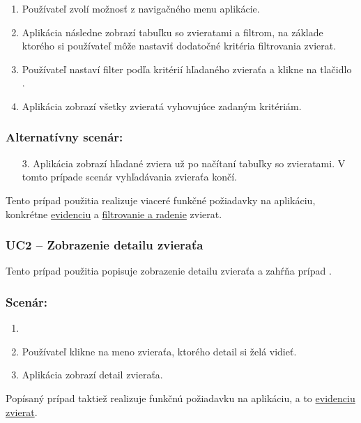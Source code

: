 \begin{enumerate}
	\item Používateľ zvolí možnosť  z navigačného menu aplikácie.
	\item Aplikácia následne zobrazí tabuľku so zvieratami a filtrom, na základe ktorého si používateľ môže nastaviť dodatočné kritéria filtrovania zvierat.
	\item Používateľ nastaví filter podľa kritérií hľadaného zvieraťa a klikne na tlačidlo .
	\item Aplikácia zobrazí všetky zvieratá vyhovujúce zadaným kritériám.
\end{enumerate}

\subsubsection*{Alternatívny scenár:}

\begin{enumerate}
    \item [3.] Aplikácia zobrazí hľadané zviera už po načítaní tabuľky so zvieratami. V tomto prípade scenár vyhľadávania zvieraťa končí.
\end{enumerate}

Tento prípad použitia realizuje viaceré funkčné požiadavky na aplikáciu, konkrétne \hyperref[evidencia-zvierat]{evidenciu} a \hyperref[filtrovanie-a-radenie]{filtrovanie a radenie} zvierat.

\subsubsection*{UC2 -- Zobrazenie detailu zvieraťa}\label{uc2}

Tento prípad použitia popisuje zobrazenie detailu zvieraťa a zahŕňa prípad .

\subsubsection*{Scenár:}

\begin{enumerate}
	\item {}
	\item Používateľ klikne na meno zvieraťa, ktorého detail si želá vidieť.
	\item Aplikácia zobrazí detail zvieraťa.
\end{enumerate}

Popísaný prípad taktiež realizuje funkčnú požiadavku na aplikáciu, a to \hyperref[evidencia-zvierat]{evidenciu zvierat}.

